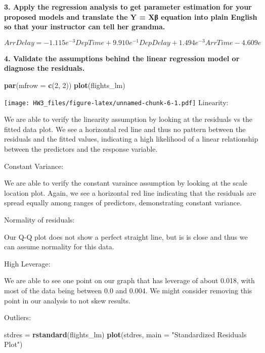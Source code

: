 \documentclass[
]{article}
\newenvironment{Shaded}{\begin{snugshade}}{\end{snugshade}}
\newcommand{\DataTypeTok}[1]{\textcolor[rgb]{0.13,0.29,0.53}{#1}}
\newcommand{\DecValTok}[1]{\textcolor[rgb]{0.00,0.00,0.81}{#1}}
\newcommand{\KeywordTok}[1]{\textcolor[rgb]{0.13,0.29,0.53}{\textbf{#1}}}
\newcommand{\NormalTok}[1]{#1}
\newcommand{\StringTok}[1]{\textcolor[rgb]{0.31,0.60,0.02}{#1}}
\begin{document}
\textbf{3. Apply the regression analysis to get parameter estimation for
your proposed models and translate the Y = Xβ equation into plain
English so that your instructor can tell her grandma.}

\[ ArrDelay = -1.115e^{-3}DepTime + 9.910e^{-1}DepDelay + 1.494e^{-3}ArrTime -4.609e \]

\textbf{4. Validate the assumptions behind the linear regression model
or diagnose the residuals.}

\begin{Shaded}
\begin{Highlighting}[]
\KeywordTok{par}\NormalTok{(}\DataTypeTok{mfrow =} \KeywordTok{c}\NormalTok{(}\DecValTok{2}\NormalTok{, }\DecValTok{2}\NormalTok{))}
\KeywordTok{plot}\NormalTok{(flights_lm)}
\end{Highlighting}
\end{Shaded}

\texttt{[image: HW3\_files/figure-latex/unnamed-chunk-6-1.pdf]}
Linearity:

We are able to verify the linearity assumption by looking at the
residuals vs the fitted data plot. We see a horizontal red line and thus
no pattern between the residuals and the fitted values, indicating a
high likelihood of a linear relationship between the predictors and the
response variable.

Constant Variance:

We are able to verify the constant varaince assumption by looking at the
scale location plot. Again, we see a horizontal red line indicating that
the residuals are spread equally among ranges of predictors,
demonstrating constant variance.

Normality of residuals:

Our Q-Q plot does not show a perfect straight line, but is is close and
thus we can assume normality for this data.

High Leverage:

We are able to see one point on our graph that has leverage of about
0.018, with most of the data being between 0.0 and 0.004. We might
consider removing this point in our analysis to not skew results.

Outliers:

\begin{Shaded}
\begin{Highlighting}[]
\NormalTok{stdres =}\StringTok{ }\KeywordTok{rstandard}\NormalTok{(flights_lm)}
\KeywordTok{plot}\NormalTok{(stdres, }\DataTypeTok{main =} \StringTok{"Standardized Residuals Plot"}\NormalTok{)}
\end{Highlighting}
\end{Shaded}
\end{document}
